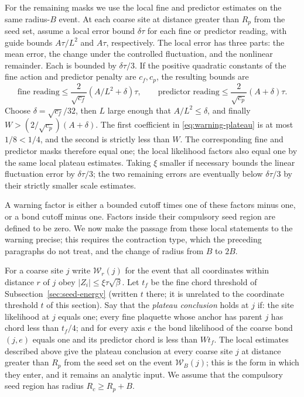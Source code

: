 For the remaining masks we use the local fine and predictor estimates
on the same radius-$B$ event. At each coarse site at distance greater
than $R_p$ from the seed set, assume a local error bound $\delta\tau$ for
each fine or predictor reading, with guide bounds $A\tau/L^2$ and
$A\tau$, respectively. The local error has three
parts: the mean error, the change under the controlled fluctuation,
and the nonlinear remainder. Each is bounded by $\delta\tau/3$.
If the positive quadratic constants of the fine action and predictor
penalty are $c_f,c_p$, the resulting bounds are
\begin{equation}\label{eq:warning-plateau}
 \text{fine reading}\le \frac{2}{\sqrt{c_f}}(A/L^2+\delta)\tau,
 \qquad
 \text{predictor reading}\le \frac{2}{\sqrt{c_p}}(A+\delta)\tau.
\end{equation}
Choose $\delta=\sqrt{c_f}/32$, then $L$ large enough that
$A/L^2\le\delta$, and finally
$W>(2/\sqrt{c_p})(A+\delta)$. The first coefficient in
\eqref{eq:warning-plateau} is at most $1/8<1/4$, and the second is
strictly less than $W$. The corresponding fine and predictor masks
therefore equal one; the local likelihood factors also equal one by
the same local plateau estimates. Taking $\xi$ smaller if necessary
bounds the linear fluctuation error by $\delta\tau/3$; the two
remaining errors are eventually below $\delta\tau/3$ by their
strictly smaller scale estimates.

A warning factor is either a bounded cutoff times one of these
factors minus one, or a bond cutoff minus one. Factors inside their
compulsory seed region are defined to be zero. We now make the
passage from these local statements to the warning precise; this
requires the contraction type, which the preceding paragraphs do not
treat, and the change of radius from $B$ to $2B$.

For a coarse site $j$ write $\mathcal W_r(j)$ for the event that all
coordinates within distance $r$ of $j$ obey $|Z_i|\le\xi\tau\sqrt\beta$.
Let $t_f$ be the fine chord threshold of Subsection~\ref{sec:seed-energy}
(written $t$ there; it is unrelated to the coordinate threshold $t$ of
this section). Say that the \emph{plateau conclusion} holds at $j$ if:
the site likelihood at $j$ equals one; every fine plaquette whose
anchor has parent $j$ has chord less than $t_f/4$; and for every axis
$e$ the bond likelihood of the coarse bond $(j,e)$ equals one and its
predictor chord is less than $Wt_f$. The local estimates described
above give the plateau conclusion at every coarse site $j$ at distance
greater than $R_p$ from the seed set on the event $\mathcal W_B(j)$;
this is the form in which they enter, and it remains an analytic input.
We assume that the compulsory seed region has radius $R_c\ge R_p+B$.

